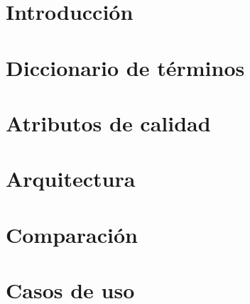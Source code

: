 \documentclass[10pt, a4paper]{article}
\begin{document}
\maketitle
\tableofcontents
\newpage

\section{Introducción}

	

\section{Diccionario de términos}

	
	\newpage

\section{Atributos de calidad}
	\label{sec:calidad}

	
	\newpage

\section{Arquitectura}
	\label{sec:arquitectura}

	
	\newpage

\section{Comparación}
	\label{sec:comparacion}

	
	\newpage

\section{Casos de uso}
	\label{sec:cu}

	
\end{document}
